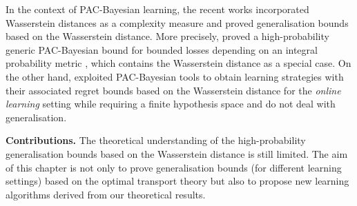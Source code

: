 In the context of PAC-Bayesian learning, the recent works \cite{amit2022integral,chee2021learning} incorporated Wasserstein distances as a complexity measure and proved generalisation bounds based on the Wasserstein distance.
More precisely, \cite{amit2022integral} proved a high-probability generic PAC-Bayesian bound for bounded losses depending on an integral probability metric \citep{muller1997integral}, which contains the Wasserstein distance as a special case. 
On the other hand, \cite{chee2021learning} exploited PAC-Bayesian tools to obtain learning strategies with their associated regret bounds based on the Wasserstein distance for the \emph{online learning} setting while requiring a finite hypothesis space and do not deal with generalisation.

\textbf{Contributions.}
The theoretical understanding of the high-probability generalisation bounds based on the Wasserstein distance is still limited.
The aim of this chapter is not only to prove generalisation bounds (for different learning settings) based on the optimal transport theory but also to propose new learning algorithms derived from our theoretical results.
